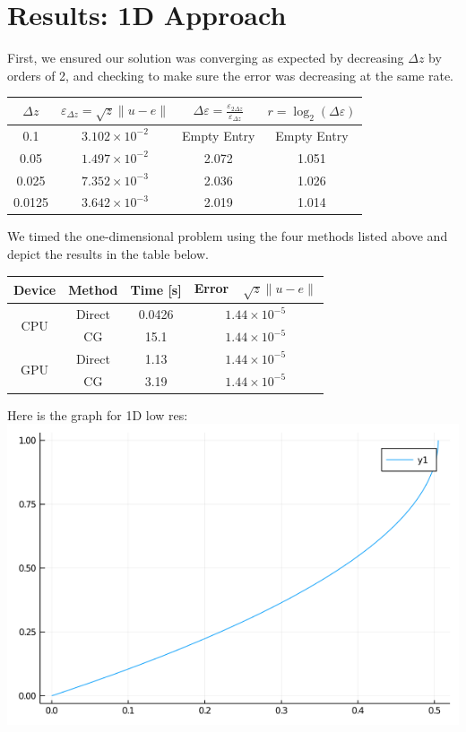 \documentclass[11pt]{article}
\begin{document}
	\section{Results: 1D Approach}
	First, we ensured our solution was converging as expected by decreasing $ \Delta z $ by orders of 2, and checking to make sure the error was decreasing at the same rate.
	\begin{center}
		\renewcommand{\arraystretch}{2.0}
		\begin{tabular}{c|c|c|c}
			\hline\hline
			$\displaystyle \Delta z $&$\displaystyle \varepsilon_{\Delta z} = \sqrt{z}\lVert u-e\rVert $&$ \displaystyle \Delta\varepsilon = \frac{\varepsilon_{2\Delta z}}{\varepsilon_{\Delta z}} $&$\displaystyle r = \log_2\left(\Delta\varepsilon\right) $\\
			\hline
			0.1&$3.102\times 10^{-2}$&Empty Entry&Empty Entry\\
			0.05&$1.497\times 10^{-2}$&2.072&1.051\\
			0.025&$7.352\times 10^{-3}$&2.036&1.026\\
			0.0125&$3.642\times 10^{-3}$&2.019&1.014\\
			\hline
		\end{tabular}
	\end{center}
	We timed the one-dimensional problem using the four methods listed above and depict the results in the table below.
	\begin{center}
		\renewcommand{\arraystretch}{1.5}
		\begin{tabular}{c|c|c|c}
			\hline\hline
			\textbf{Device}&\textbf{Method}&\textbf{Time [s]}&\textbf{Error~~$\sqrt{z}\lVert u-e\rVert $}\\
			\hline
			\multirow{2}{*}{CPU}&Direct&0.0426&$1.44\times 10^{-5}$\\
			&CG&15.1&$1.44\times 10^{-5}$\\
			\hline
			\multirow{2}{*}{GPU}&Direct&1.13&$1.44\times 10^{-5}$\\
			&CG&3.19&$1.44\times 10^{-5}$\\
			\hline
		\end{tabular}
	\end{center}

		Here is the graph for 1D low res:\\
		\includegraphics[scale=0.5]{1D_low_res.png}
		
\end{document}
